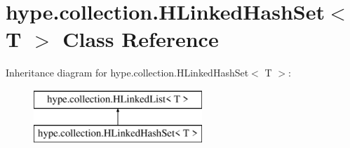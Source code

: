 \hypertarget{classhype_1_1collection_1_1_h_linked_hash_set_3_01_t_01_4}{\section{hype.\-collection.\-H\-Linked\-Hash\-Set$<$ T $>$ Class Reference}
\label{classhype_1_1collection_1_1_h_linked_hash_set_3_01_t_01_4}
}
Inheritance diagram for hype.\-collection.\-H\-Linked\-Hash\-Set$<$ T $>$\-:\begin{figure}[H]
\begin{center}
\leavevmode
\includegraphics[height=2.000000cm]{classhype_1_1collection_1_1_h_linked_hash_set_3_01_t_01_4}
\end{center}
\end{figure}
